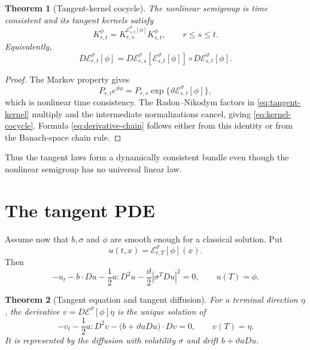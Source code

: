\documentclass[11pt,reqno]{amsart}
\newtheorem{theorem}{Theorem}[section]
\theoremstyle{definition}
\theoremstyle{remark}
\newcommand{\cE}{\mathcal E}
\newcommand{\abs}[1]{\left\lvert #1\right\rvert}
\begin{document}
\begin{theorem}[Tangent-kernel cocycle]\label{thm:cocycle}
The nonlinear semigroup is time consistent and its tangent kernels satisfy
\begin{equation}\label{eq:kernel-cocycle}
 K_{r,t}^{\phi}
 =K_{r,s}^{\cE_{s,t}^{\vartheta}[\phi]}
  K_{s,t}^{\phi},
 \qquad r\le s\le t.
\end{equation}
Equivalently,
\begin{equation}\label{eq:derivative-chain}
 D\cE_{r,t}^{\vartheta}[\phi]
 =D\cE_{r,s}^{\vartheta}
   [\cE_{s,t}^{\vartheta}[\phi]]
 \circ D\cE_{s,t}^{\vartheta}[\phi].
\end{equation}
\end{theorem}

\begin{proof}
The Markov property gives
\[
 P_{r,t}e^{\vartheta\phi}
 =P_{r,s}\exp\{\vartheta\cE_{s,t}^{\vartheta}[\phi]\},
\]
which is nonlinear time consistency.  The Radon--Nikodym factors in
\eqref{eq:tangent-kernel} multiply and the intermediate normalizations cancel,
giving \eqref{eq:kernel-cocycle}.  Formula \eqref{eq:derivative-chain} follows
either from this identity or from the Banach-space chain rule.
\end{proof}

Thus the tangent laws form a dynamically consistent bundle even though the
nonlinear semigroup has no universal linear law.

\section{The tangent PDE}\label{sec:tangent-PDE}

Assume now that $b,\sigma$ and $\phi$ are smooth enough for a classical
solution.  Put
\[
 u(t,x)=\cE_{t,T}^{\vartheta}[\phi](x).
\]
Then
\begin{equation}\label{eq:entropic-PDE}
 -u_t-b\cdot Du-\frac12a:D^2u
 -\frac\vartheta2\abs{\sigma^TDu}^2=0,
 \qquad u(T)=\phi.
\end{equation}

\begin{theorem}[Tangent equation and tangent diffusion]\label{thm:tangent-PDE}
For a terminal direction $\eta$, the derivative
$v=D\cE^{\vartheta}[\phi]\eta$ is the unique solution of
\begin{equation}\label{eq:entropic-tangent}
 -v_t-\frac12a:D^2v
 -\bigl(b+\vartheta aDu\bigr)\cdot Dv=0,
 \qquad v(T)=\eta.
\end{equation}
It is represented by the diffusion with volatility $\sigma$ and drift
$b+\vartheta aDu$.
\end{theorem}
\end{document}
